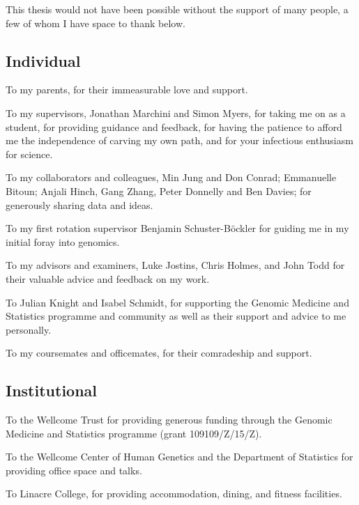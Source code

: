 
This thesis would not have been possible without the support of many people, a few of whom I have space to thank below.

\subsection*{Individual}

To my parents, for their immeasurable love and support.

To my supervisors, Jonathan Marchini and Simon Myers, for taking me on as a student, for providing guidance and feedback, for having the patience to afford me the independence of carving my own path, and for your infectious enthusiasm for science.

To my collaborators and colleagues, Min Jung and Don Conrad; Emmanuelle Bitoun; Anjali Hinch, Gang Zhang, Peter Donnelly and Ben Davies; for generously sharing data and ideas.

To my first rotation supervisor Benjamin Schuster-Böckler for guiding me in my initial foray into genomics.

To my advisors and examiners, Luke Jostins, Chris Holmes, and John Todd for their valuable advice and feedback on my work.

To Julian Knight and Isabel Schmidt, for supporting the Genomic Medicine and Statistics programme and community as well as their support and advice to me personally.

To my coursemates and officemates, for their comradeship and support.

\subsection*{Institutional}

To the Wellcome Trust for providing generous funding through the Genomic Medicine and Statistics programme (grant 109109/Z/15/Z).

To the Wellcome Center of Human Genetics and the Department of Statistics for providing office space and talks.

To Linacre College, for providing accommodation, dining, and fitness facilities.